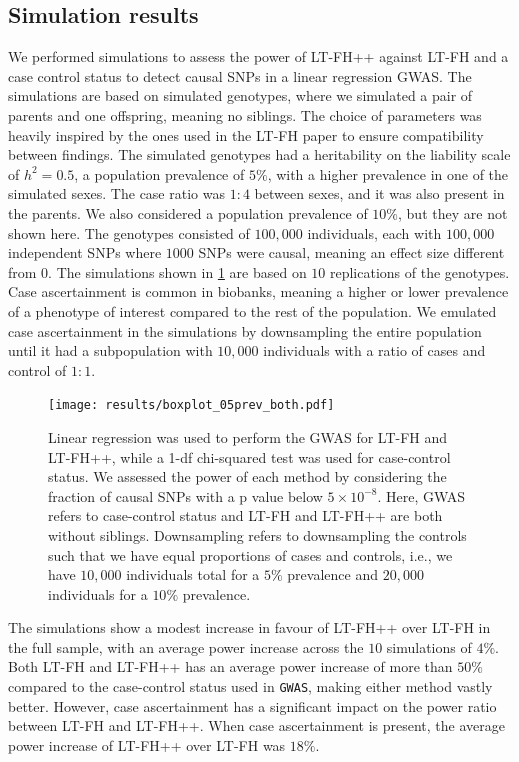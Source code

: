 \subsection{Simulation results}
We performed simulations to assess the power of LT-FH++ against LT-FH and a case control status to detect causal SNPs in a linear regression GWAS. The simulations are based on simulated genotypes, where we simulated a pair of parents and one offspring, meaning no siblings. The choice of parameters was heavily inspired by the ones used in the LT-FH paper to ensure compatibility between findings. The simulated genotypes had a heritability on the liability scale of $ h^2 = 0.5 $, a population prevalence of $ 5\% $, with a higher prevalence in one of the simulated sexes. The case ratio was $ 1:4 $ between sexes, and it was also present in the parents. We also considered a population prevalence of $ 10\% $, but they are not shown here. The genotypes consisted of $ 100,000 $ individuals, each with $ 100,000 $ independent SNPs where $ 1000 $ SNPs were causal, meaning an effect size different from $ 0 $. The simulations shown in \cref{fig:LTFHppSimulationResults} are based on $ 10 $ replications of the genotypes. Case ascertainment is common in biobanks, meaning a higher or lower prevalence of a phenotype of interest compared to the rest of the population. We emulated case ascertainment in the simulations by downsampling the entire population until it had a subpopulation with $ 10,000 $ individuals with a ratio of cases and control of $ 1:1 $.
\begin{figure}[h]
	\texttt{[image: results/boxplot\_05prev\_both.pdf]}
	\caption[Simulation results for a $ 5\% $ prevalence, with and without downsampling of controls]{Linear regression was used to perform the GWAS for LT-FH and LT-FH++, while a 1-df chi-squared test was used for case-control status. We assessed the power of each method by considering the fraction of causal SNPs with a p value below $ 5 \times 10^{-8} $. Here, GWAS refers to case-control status and LT-FH and LT-FH++ are both without siblings. Downsampling refers to downsampling the controls such that we have equal proportions of cases and controls, i.e., we have $ 10,000 $ individuals total for a $ 5\% $ prevalence and $ 20,000 $ individuals for a $ 10\% $ prevalence.}
	\label{fig:LTFHppSimulationResults}
\end{figure}

The simulations show a modest increase in favour of LT-FH++ over LT-FH in the full sample, with an average power increase across the $ 10 $ simulations of $ 4\% $. Both LT-FH and LT-FH++ has an average power increase of more than $ 50\% $ compared to the case-control status used in \texttt{GWAS}, making either method vastly better. However, case ascertainment has a significant impact on the power ratio between LT-FH and LT-FH++. When case ascertainment is present, the average power increase of LT-FH++ over LT-FH was $ 18\% $.

